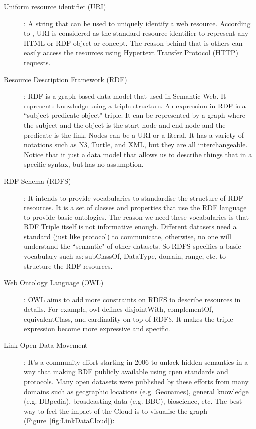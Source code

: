 \begin{description}

\item[Uniform resource identifier (URI)]: A string that can be used to uniquely identify a web resource. According to \cite{berners2006design}, URI is considered as the standard resource identifier to represent any HTML or RDF object or concept. The reason behind that is others can easily access the resources using Hypertext Transfer Protocol (HTTP) requests.

\item[Resource Description Framework (RDF)]: RDF is a graph-based data model that used in Semantic Web. It represents knowledge using a triple structure. An expression in RDF is a ``subject-predicate-object" triple. It can be represented by a graph where the subject and the object is the start node and end node and the predicate is the link. Nodes can be a URI or a literal.  It has a variety of notations such as N3, Turtle, and XML, but they are all interchangeable. Notice that it just a data model that allows us to describe things that in a specific syntax, but has no assumption.

\item[RDF Schema (RDFS)]: It intends to provide vocabularies to standardise the structure of RDF resources. It is a set of classes and properties that use the RDF language to provide basic ontologies. The reason we need these vocabularies is that RDF Triple itself is not informative enough.  Different datasets need a standard (just like protocol) to communicate, otherwise, no one will understand the ``semantic" of other datasets. So RDFS specifies a basic vocabulary such as: subClassOf, DataType, domain, range, etc. to structure the RDF resources.

\item[Web Ontology Language (OWL)]: OWL aims to add more constraints on RDFS to describe resources in details. For example, owl defines disjointWith, complementOf, equivalentClass, and cardinality on top of RDFS. It makes the triple expression become more expressive and specific.

\item[Link Open Data Movement]: It's a community effort starting in 2006 to unlock hidden semantics in a way that making RDF publicly available using open standards and protocols. Many open datasets were published by these efforts from many domains such as geographic locations (e.g. Geonames), general knowledge (e.g. DBpedia), broadcasting data (e.g. BBC), bioscience, etc. The best way to feel the impact of the Cloud is to visualise the graph (Figure~\ref{fig:LinkDataCloud}):


\end{description}
